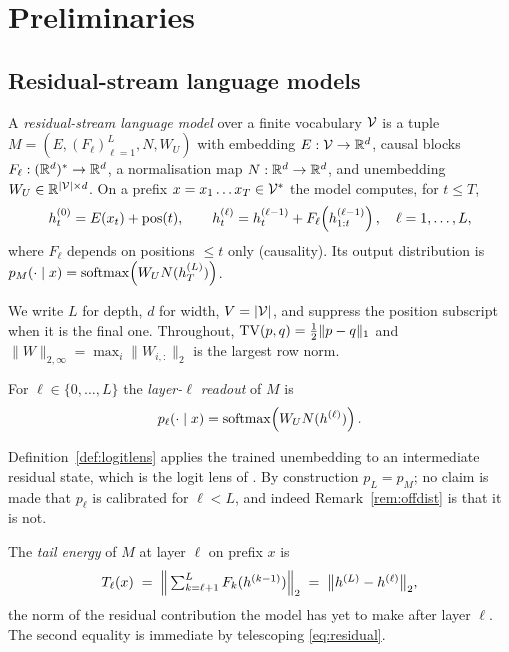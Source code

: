 \section{Preliminaries}
\label{sec:prelim}

\subsection{Residual-stream language models}

\begin{definition}
\label{def:model}
A \emph{residual-stream language model} over a finite vocabulary $\mathcal{V}$ is a
tuple $M = (E, (F_\ell)_{\ell=1}^{L}, N, W_U)$ with embedding
$E : \mathcal{V} \to \mathbb{R}^{d}$, causal blocks
$F_\ell : (\mathbb{R}^{d})^{*} \to \mathbb{R}^{d}$, a normalisation map
$N : \mathbb{R}^d \to \mathbb{R}^d$, and unembedding $W_U \in \mathbb{R}^{|\mathcal{V}| \times d}$.
On a prefix $x = x_1 \dots x_T \in \mathcal{V}^{*}$ the model computes, for
$t \le T$,
\begin{equation}
  h^{(0)}_t = E(x_t) + \mathrm{pos}(t),
  \qquad
  h^{(\ell)}_t = h^{(\ell-1)}_t + F_\ell\!\left(h^{(\ell-1)}_{1:t}\right),
  \quad \ell = 1,\dots,L ,
  \label{eq:residual}
\end{equation}
where $F_\ell$ depends on positions $\le t$ only (causality). Its output
distribution is $p_M(\cdot \mid x) = \mathrm{softmax}\!\left(W_U N(h^{(L)}_T)\right)$.
\end{definition}

We write $L$ for depth, $d$ for width, $V = |\mathcal{V}|$, and suppress the position
subscript when it is the final one. Throughout, $\mathrm{TV}(p,q) = \tfrac12\|p-q\|_1$
and $\|W\|_{2,\infty} = \max_i \|W_{i,:}\|_2$ is the largest row norm.

\begin{definition}
\label{def:logitlens}
For $\ell \in \{0,\dots,L\}$ the \emph{layer-$\ell$ readout} of $M$ is
\begin{equation}
  p_\ell(\cdot \mid x) = \mathrm{softmax}\!\left(W_U N(h^{(\ell)})\right) .
\end{equation}
\end{definition}

Definition~\ref{def:logitlens} applies the trained unembedding to an
intermediate residual state, which is the logit lens of
\cite{nostalgebraist2020}. By construction $p_L = p_M$; no claim is made that
$p_\ell$ is calibrated for $\ell < L$, and indeed Remark~\ref{rem:offdist} is
that it is not.

\begin{definition}
\label{def:tail}
The \emph{tail energy} of $M$ at layer $\ell$ on prefix $x$ is
\begin{equation}
  T_\ell(x) \;=\; \Big\| \textstyle\sum_{k=\ell+1}^{L} F_k(h^{(k-1)}) \Big\|_2
  \;=\; \big\| h^{(L)} - h^{(\ell)} \big\|_2 ,
\end{equation}
the norm of the residual contribution the model has yet to make after layer
$\ell$. The second equality is immediate by telescoping \eqref{eq:residual}.
\end{definition}

